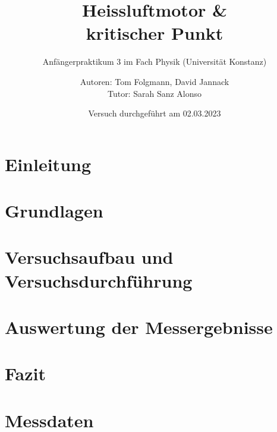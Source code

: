 \documentclass[oneside, ngerman, footinclude=off, captions=tableheading, DIV=12;usenames,dvipsnames]{scrartcl}
\begin{document}
    \title{Heissluftmotor \& \\ kritischer Punkt}
    \subtitle{Anfängerpraktikum 3 im Fach Physik (Universität Konstanz)}
    \author{Autoren: Tom Folgmann, David Jannack \\ \large{Tutor:  	Sarah Sanz Alonso}}
    \date{Versuch durchgeführt am 02.03.2023}
    \maketitle
    \thispagestyle{empty}
    \section*{Einleitung}
        

    \newpage


    \tableofcontents
    \thispagestyle{empty}	
    \newpage
    \setcounter{page}{1}


\newpage
\section{Grundlagen}
    
    
	

\newpage
\section{Versuchsaufbau und Versuchsdurchführung}
    

\newpage
\section{Auswertung der Messergebnisse}
    

\newpage
\section{Fazit}
    


\newpage
    
\newpage
    \listoffigures
    \listoftables


\newpage
    \section*{Messdaten}
    
\newpage
    



%
\end{document}
